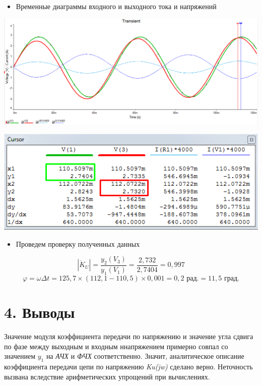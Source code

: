 \documentclass[12pt, a4paper]{report}
\begin{document}
    \newpage

    \begin{itemize}
        \item Временные диаграммы входного и выходного тока и напряжений
    \end{itemize}
    \begin{center}
        \includegraphics[scale = 0.52]{photo4.png}
    \end{center}
    \begin{center}
        \includegraphics[scale = 1.1]{photo5.png}
    \end{center}\bigskip
    \begin{itemize}
        \item Проведем проверку полученных данных
    \end{itemize}
    \[ |\dot{K}_{U}| = \frac{y_2(V_3)}{y_1(V_1)} = \frac{2,732}{2,7404} = 0,997 \]
    \[ \varphi = \omega \Delta t = 125,7 \times (112,1 - 110,5) \times 0,001 = 0,2 \textit{ рад.} = 11,5 \textit{ град.} \]\bigskip
    \section{4. Выводы}
    \begin{itemize}
        Значение модуля коэффициента передачи по напряжению и значение угла
        сдвига по фазе между выходным и входным ннапряжением примерно совпал со
        значением $y_1$ на \textit{АЧХ} и \textit{ФЧХ} соответственно. Значит, аналитическое описание
        коэффициента передачи цепи по напряжению \textit{Ku(jw)} сделано верно. Неточность
        вызвана вследствие арифметических упрощений при вычислениях.
    \end{itemize}
\end{document}
